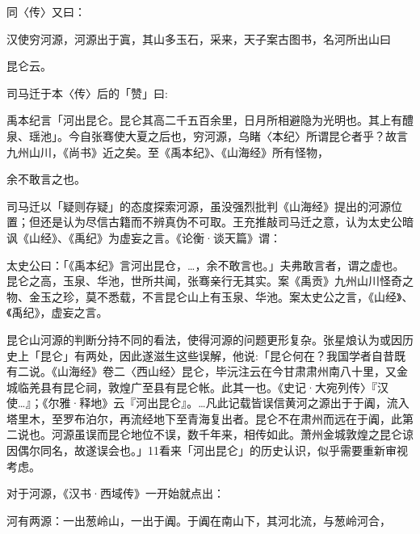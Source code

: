 \vfill
\begin{BookNotes}
\end{BookNotes}

\noindent 同〈传〉又曰：

\begin{BookQuote}
汉使穷河源，河源出于寘，其山多玉石，采来，天子案古图书，名河所出山曰
\end{BookQuote}

昆仑云。

司马迁于本〈传〉后的「赞」曰:

\begin{BookQuote}
禹本纪言「河出昆仑。昆仑其高二千五百余里，日月所相避隐为光明也。其上有醴泉、瑶池」。今自张骞使大夏之后也，穷河源，乌睹〈本纪〉所谓昆仑者乎？故言九州山川，《尚书》近之矣。至《禹本纪》、《山海经》所有怪物，
\end{BookQuote}

余不敢言之也。

司马迁以「疑则存疑」的态度探索河源，虽没强烈批判《山海经》提出的河源位置；但还是认为尽信古籍而不辨真伪不可取。王充推敲司马迁之意，认为太史公暗讽《山经》、《禹纪》为虚妄之言。《论衡·谈天篇》谓：

\begin{BookQuote}
太史公曰：「《禹本纪》言河出昆仓，…，余不敢言也。」夫弗敢言者，谓之虚也。昆仑之高，玉泉、华池，世所共闻，张骞亲行无其实。案《禹贡》九州山川怪奇之物、金玉之珍，莫不悉载，不言昆仑山上有玉泉、华池。案太史公之言，《山经》、《禹纪》，虚妄之言。
\end{BookQuote}

昆仑山河源的判断分持不同的看法，使得河源的问题更形复杂。张星烺认为或因历史上「昆仑」有两处，因此遂滋生这些误解，他说:「昆仑何在？我国学者自昔既有二说。《山海经》卷二〈西山经〉昆仑，毕沅注云在今甘肃肃州南八十里，又金城临羌县有昆仑祠，敦煌广至县有昆仑帐。此其一也。《史记·大宛列传〉『汉使…』；《尔雅·释地》云『河出昆仑』。…凡此记载皆误信黄河之源出于于阗，流入塔里木，至罗布泊尔，再流经地下至青海复出者。昆仑不在肃州而远在于阗，此第二说也。河源虽误而昆仑地位不误，数千年来，相传如此。萧州金城敦煌之昆仑谅因偶尔同名，故遂误会也。」11看来「河出昆仑」的历史认识，似乎需要重新审视考虑。

对于河源，《汉书·西域传》一开始就点出：

\begin{BookQuote}
河有两源：一出葱岭山，一出于阗。于阗在南山下，其河北流，与葱岭河合，
\end{BookQuote}

